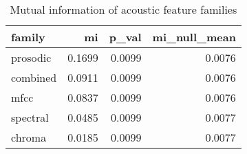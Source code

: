\begin{table}
\caption{Mutual information of acoustic feature families}
\label{tab:mi_scores}
\begin{tabular}{lrrr}
\toprule
family & mi & p_val & mi_null_mean \\
\midrule
prosodic & 0.1699 & 0.0099 & 0.0076 \\
combined & 0.0911 & 0.0099 & 0.0076 \\
mfcc & 0.0837 & 0.0099 & 0.0076 \\
spectral & 0.0485 & 0.0099 & 0.0077 \\
chroma & 0.0185 & 0.0099 & 0.0077 \\
\bottomrule
\end{tabular}
\end{table}
